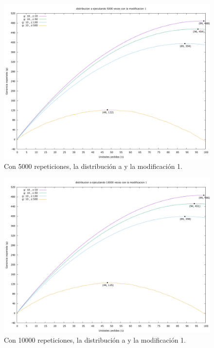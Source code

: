 \documentclass[12pt, spanish]{article}
\begin{document}
\begin{figure}[H]
	\centering
	\includegraphics[scale = 0.3]{prob_a/datos_a_5000_1.png}
	\caption{Con 5000 repeticiones, la distribución a y la modificación 1.}
	\label{fig:ej1_a_5000}

\end{figure}


\begin{figure}[H]
	\centering
	\includegraphics[scale = 0.3]{prob_a/datos_a_10000_1.png}
	\caption{Con 10000 repeticiones, la distribución a y la modificación 1.}
	\label{fig:ej1_a_10000}

\end{figure}
\end{document}
